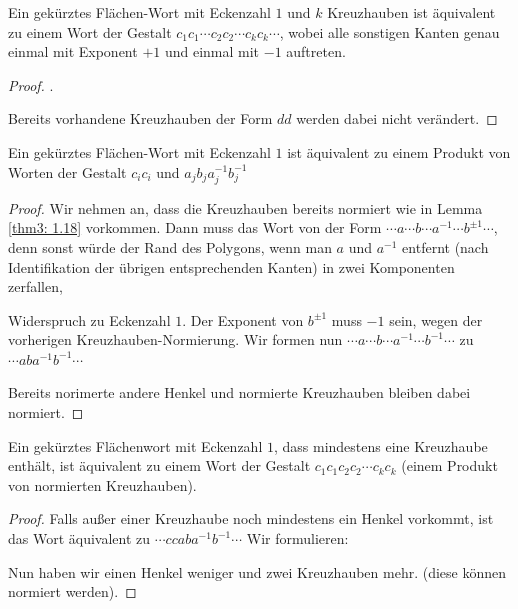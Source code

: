 \documentclass[a4paper,10pt]{scrartcl}
\begin{document}
\begin{lem} \label{thm3: 1.18} 
 Ein gekürztes Flächen-Wort mit Eckenzahl $1$ und $k$ Kreuzhauben ist äquivalent zu einem Wort der Gestalt $c_1c_1\dotsb c_2c_2\dotsb c_kc_k\dotsb $, wobei alle sonstigen Kanten genau einmal mit Exponent $+1$ und einmal mit $-1$ auftreten.
\end{lem}
\begin{proof}
.
 \begin{figure}[H]
 \centering
\fixme[fig147]
\caption{}
\end{figure}
Bereits vorhandene Kreuzhauben der Form $dd$ werden dabei nicht verändert.
\end{proof}

\begin{lem}
 Ein gekürztes Flächen-Wort mit Eckenzahl $1$ ist äquivalent zu einem Produkt von Worten der Gestalt $c_ic_i$ und $a_jb_ja_j^{-1}b_j^{-1}$
\end{lem}
\begin{proof}
 Wir nehmen an, dass die Kreuzhauben bereits normiert wie in Lemma \ref{thm3: 1.18} vorkommen. Dann muss das Wort von der Form $\dotsb a\dotsb b\dotsb a^{-1}\dotsb b^{\pm1}\dotsb $, denn sonst würde der Rand des Polygons, wenn man $a$ und $a^{-1}$ entfernt (nach Identifikation der übrigen entsprechenden Kanten) in zwei Komponenten zerfallen,
\begin{figure}[H]
 \centering
\fixme[fig148]
\caption{}
\end{figure}
Widerspruch zu Eckenzahl $1$. Der Exponent von $b^{\pm 1}$ muss $-1$ sein, wegen der vorherigen Kreuzhauben-Normierung. Wir formen nun $\dotsb a\dotsb b\dotsb a^{-1}\dotsb b^{-1}\dotsb $ zu $\dotsb aba^{-1}b^{-1}\dotsb $
\begin{figure}[H]
 \centering
\fixme[fig149]
\caption{}
\end{figure}
Bereits norimerte andere Henkel und normierte Kreuzhauben bleiben dabei normiert.
\end{proof}
\begin{lem}
 Ein gekürztes Flächenwort mit Eckenzahl $1$, dass mindestens eine Kreuzhaube enthält, ist äquivalent zu einem Wort der Gestalt $c_1c_1c_2c_2\dotsb c_kc_k$
(einem Produkt von normierten Kreuzhauben).
\end{lem}
\begin{proof}
 Falls außer einer Kreuzhaube noch mindestens ein Henkel vorkommt, ist das Wort äquivalent zu $\dotsb ccaba^{-1}b^{-1}\dotsb $ Wir formulieren:
\begin{figure}[H]
 \centering
\fixme[fig150]
\caption{}
\end{figure}
Nun haben wir einen Henkel weniger und zwei Kreuzhauben mehr. (diese können normiert werden).
\end{proof}
\end{document}
